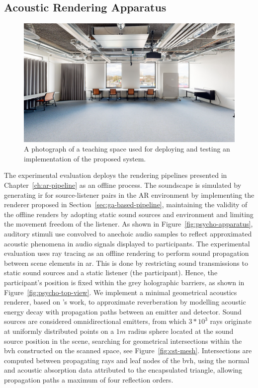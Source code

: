 \subsection{Acoustic Rendering Apparatus}
\begin{figure}[htbp]
    \centering
    \includegraphics[width=1\linewidth]{7_evaluation/images/CST-208-2.png}
    \caption{A photograph of a teaching space used for deploying and testing an implementation of the proposed system.}
    \label{fig:cst-208-photograph}
\end{figure}
The experimental evaluation deploys the rendering pipelines presented in Chapter~\ref{ch:ar-pipeline} as an offline process. The soundscape is simulated by generating \acrshort{ir} for source-listener pairs in the AR environment by implementing the renderer proposed in Section~\ref{sec:ga-based-pipeline}, maintaining the validity of the offline renders by adopting static sound sources and environment and limiting the movement freedom of the listener. As shown in Figure~\ref{fig:psycho-apparatus}, auditory stimuli use  convolved to anechoic audio samples to reflect approximated acoustic phenomena in audio signals displayed to participants. The experimental evaluation uses ray tracing as an offline rendering to perform sound propagation between scene elements in \acrshort{ar}. This is done by restricting sound transmissions to static sound sources and a static listener (the participant). Hence, the participant's position is fixed within the grey holographic barriers, as shown in Figure~\ref{fig:psycho-top-view}.
We implement a minimal geometrical acoustics renderer, based on \cite{saviojaGA}'s work, to approximate reverberation by modelling acoustic energy decay with propagation paths between an emitter and detector. Sound sources are considered omnidirectional emitters, from which $3*10^3$ rays originate at uniformly distributed points on a $1m$ radius sphere located at the sound source position in the scene, searching for geometrical intersections within the \acrshort{bvh} constructed on the scanned space, see Figure~\ref{fig:cst-mesh}. Intersections are computed between propagating rays and leaf nodes of the \acrshort{bvh}, using the normal and acoustic absorption data attributed to the encapsulated triangle, allowing propagation paths a maximum of four reflection orders.
